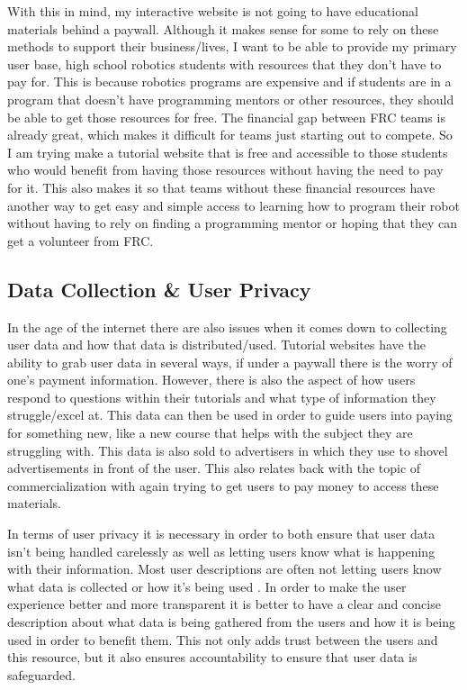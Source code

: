 \documentclass[10pt,twocolumn]{article}
\begin{document}
With this in mind, my interactive website is not going to have educational materials behind a paywall. Although it makes sense for some to rely on these methods to support their business/lives, I want to be able to provide my primary user base, high school robotics students with resources that they don't have to pay for. This is because robotics programs are expensive and if students are in a program that doesn't have programming mentors or other resources, they should be able to get those resources for free. The financial gap between FRC teams is already great, which makes it difficult for teams just starting out to compete. So I am trying make a tutorial website that is free and accessible to those students who would benefit from having those resources without having the need to pay for it. This also makes it so that teams without these financial resources have another way to get easy and simple access to learning how to program their robot without having to rely on finding a programming mentor or hoping that they can get a volunteer from FRC. 

\subsection{Data Collection \& User Privacy}
In the age of the internet there are also issues when it comes down to collecting user data and how that data is distributed/used. Tutorial websites have the ability to grab user data in several ways, if under a paywall there is the worry of one's payment information. However, there is also the aspect of how users respond to questions within their tutorials and what type of information they struggle/excel at. This data can then be used in order to guide users into paying for something new, like a new course that helps with the subject they are struggling with. This data is also sold to advertisers in which they use to shovel advertisements in front of the user. This also relates back with the topic of commercialization with again trying to get users to pay money to access these materials.


In terms of user privacy it is necessary in order to both ensure that user data isn't being handled carelessly as well as letting users know what is happening with their information. Most user descriptions are often not letting users know what data is collected or how it's being used \cite{kyi_it_2024}. In order to make the user experience better and more transparent it is better to have a clear and concise description about what data is being gathered from the users and how it is being used in order to benefit them. This not only adds trust between the users and this resource, but it also ensures accountability to ensure that user data is safeguarded.
\end{document}
